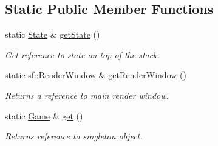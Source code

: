 \subsection*{Static Public Member Functions}
\begin{DoxyCompactItemize}
\item 
\hypertarget{classGame_aa742f626e4b8a5dac8677ef40263716c}{static \hyperlink{classState}{State} \& \hyperlink{classGame_aa742f626e4b8a5dac8677ef40263716c}{get\-State} ()}\label{classGame_aa742f626e4b8a5dac8677ef40263716c}

\begin{DoxyCompactList}\small\item\em Get reference to state on top of the stack. \end{DoxyCompactList}\item 
\hypertarget{classGame_ada9faa2a1f4e1453420adead02fd9865}{static sf\-::\-Render\-Window \& \hyperlink{classGame_ada9faa2a1f4e1453420adead02fd9865}{get\-Render\-Window} ()}\label{classGame_ada9faa2a1f4e1453420adead02fd9865}

\begin{DoxyCompactList}\small\item\em Returns a reference to main render window. \end{DoxyCompactList}\item 
\hypertarget{classGame_ac69a0c5e25c7acb811f4a7b86a2ceb74}{static \hyperlink{classGame}{Game} \& \hyperlink{classGame_ac69a0c5e25c7acb811f4a7b86a2ceb74}{get} ()}\label{classGame_ac69a0c5e25c7acb811f4a7b86a2ceb74}

\begin{DoxyCompactList}\small\item\em Returns reference to singleton object. \end{DoxyCompactList}\end{DoxyCompactItemize}
